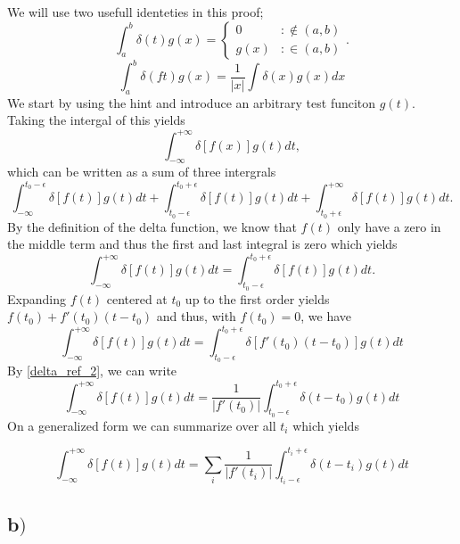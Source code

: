 \documentclass{article}
\begin{document}
We will use two usefull identeties in this proof;
\begin{equation}
\int_a^b \delta(t)g(x) = \begin{cases}0 &: \not\in (a, b) \\ g(x) &: \in (a,b)\end{cases} \label{delta_ref_1}.
\end{equation}
\begin{equation}
\int_a^b \delta(ft)g(x) = \frac{1}{|x|}\int\delta(x)g(x)dx \label{delta_ref_2}
\end{equation}
We start by using the hint and introduce an arbitrary test funciton $g(t)$. Taking the intergal of this yields
\begin{equation}
\int_{-\infty}^{+\infty} \delta[f(x)]g(t)dt,
\end{equation}
which can be written as a sum of three intergrals
\begin{equation}
\int_{-\infty}^{t_0-\epsilon} \delta[f(t)]g(t)dt + \int_{t_0-\epsilon}^{t_0 + \epsilon} \delta[f(t)]g(t)dt + \int_{t_0 + \epsilon}^{+\infty} \delta[f(t)]g(t)dt.
\end{equation}
By the definition of the delta function, we know that $f(t)$ only have a zero in the middle term and thus the first and last integral is zero which yields
\begin{equation}
\int_{-\infty}^{+\infty} \delta[f(t)]g(t)dt = \int_{t_0-\epsilon}^{t_0 + \epsilon} \delta[f(t)]g(t)dt.
\end{equation}
Expanding $f(t)$ centered at $t_0$ up to the first order yields $f(t_0) + f'(t_0)(t - t_0)$ and thus, with $f(t_0) = 0$, we have
\begin{equation}
\int_{-\infty}^{+\infty} \delta[f(t)]g(t)dt = \int_{t_0-\epsilon}^{t_0 + \epsilon} \delta[f'(t_0)(t-t_0)]g(t)dt 
\end{equation}
By \ref{delta_ref_2}, we can write
\begin{equation}
\int_{-\infty}^{+\infty} \delta[f(t)]g(t)dt = \frac{1}{|f'(t_0)|} \int_{t_0-\epsilon}^{t_0 + \epsilon} \delta(t-t_0)g(t)dt 
\end{equation}
On a generalized form we can summarize over all $t_i$ which yields

\begin{equation}
\int_{-\infty}^{+\infty} \delta[f(t)]g(t)dt = \sum_{i}\frac{1}{|f'(t_i)|} \int_{t_i-\epsilon}^{t_i + \epsilon} \delta(t-t_i)g(t)dt 
\end{equation}

\subsection*{b$)$}
\end{document}
